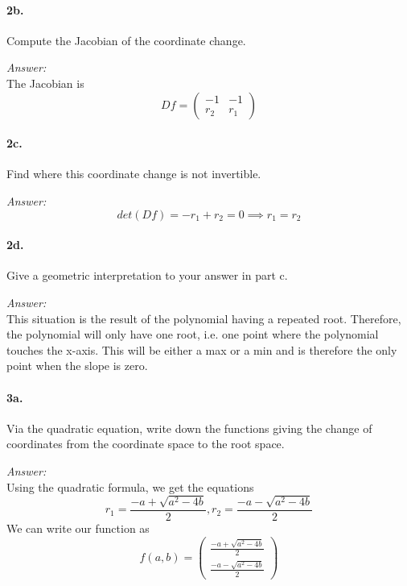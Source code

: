 \documentclass[10pt,a4paper]{article}
\begin{document}
\paragraph{2b.} Compute the Jacobian of the coordinate change.
\begin{flushleft}
\textit{Answer:}\\
The Jacobian is
$$ Df = \begin{pmatrix}
-1 & -1\\
r_2 & r_1
\end{pmatrix}$$
\end{flushleft}

\paragraph{2c.} Find where this coordinate change is not invertible.
\begin{flushleft}
\textit{Answer:}\\
$$ det(Df) = -r_1 + r_2 = 0 \implies r_1 = r_2$$
\end{flushleft}

\paragraph{2d.} Give a geometric interpretation to your answer in part c.
\begin{flushleft}
\textit{Answer:}\\
This situation is the result of the polynomial having a repeated root. Therefore, the polynomial will only have one root, i.e. one point where the polynomial touches the x-axis. This will be either a max or a min and is therefore the only point when the slope is zero.
\end{flushleft}

\paragraph{3a.} Via the quadratic equation, write down the functions giving the change of coordinates from the coordinate space to the root space.
\begin{flushleft}
\textit{Answer:}\\
Using the quadratic formula, we get the equations
$$ r_1 = \frac{-a+\sqrt{a^2-4b}}{2}, r_2 = \frac{-a-\sqrt{a^2-4b}}{2}$$
We can write our function as 
$$ f(a,b) = 
\begin{pmatrix}
\frac{-a+\sqrt{a^2-4b}}{2}\\
\frac{-a-\sqrt{a^2-4b}}{2}
\end{pmatrix}$$
\end{flushleft}
\end{document}
